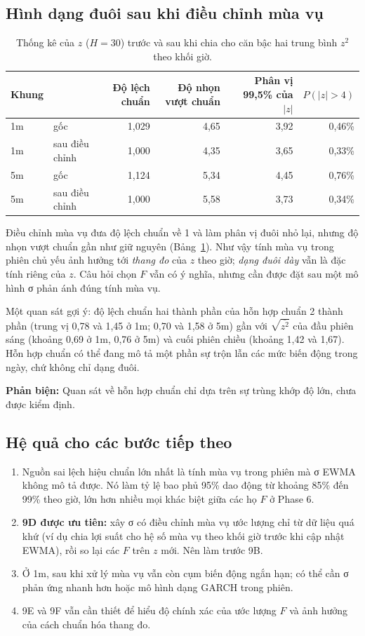 \documentclass[11pt,a4paper]{article}
\newcommand{\phanbien}[1]{\par\noindent\colorbox{orange!15}{\parbox{\dimexpr\linewidth-2\fboxsep}{\small\textbf{Phản biện:} #1}}\par}
\begin{document}
\subsection{Hình dạng đuôi sau khi điều chỉnh mùa vụ}

\begin{table}[h]
\centering
\small
\caption{Thống kê của $z$ ($H=30$) trước và sau khi chia cho căn bậc hai trung bình $z^2$ theo khối giờ.}
\label{tab:9a-duoi}
\begin{tabular}{llrrrr}
\toprule
Khung & & Độ lệch chuẩn & Độ nhọn vượt chuẩn & Phân vị 99,5\% của $|z|$ & $P(|z|>4)$ \\
\midrule
1m & gốc & 1,029 & 4,65 & 3,92 & 0,46\% \\
1m & sau điều chỉnh & 1,000 & 4,35 & 3,65 & 0,33\% \\
5m & gốc & 1,124 & 5,34 & 4,45 & 0,76\% \\
5m & sau điều chỉnh & 1,000 & 5,58 & 3,73 & 0,34\% \\
\bottomrule
\end{tabular}
\end{table}

Điều chỉnh mùa vụ đưa độ lệch chuẩn về 1 và làm phân vị đuôi nhỏ lại, nhưng độ nhọn vượt chuẩn gần như giữ nguyên (Bảng~\ref{tab:9a-duoi}). Như vậy tính mùa vụ trong phiên chủ yếu ảnh hưởng tới \emph{thang đo} của $z$ theo giờ; \emph{dạng đuôi dày} vẫn là đặc tính riêng của $z$. Câu hỏi chọn $F$ vẫn có ý nghĩa, nhưng cần được đặt sau một mô hình σ phản ánh đúng tính mùa vụ.

Một quan sát gợi ý: độ lệch chuẩn hai thành phần của hỗn hợp chuẩn 2 thành phần (trung vị 0,78 và 1,45 ở 1m; 0,70 và 1,58 ở 5m) gần với $\sqrt{\overline{z^2}}$ của đầu phiên sáng (khoảng 0,69 ở 1m, 0,76 ở 5m) và cuối phiên chiều (khoảng 1,42 và 1,67). Hỗn hợp chuẩn có thể đang mô tả một phần sự trộn lẫn các mức biến động trong ngày, chứ không chỉ dạng đuôi.

\phanbien{Quan sát về hỗn hợp chuẩn chỉ dựa trên sự trùng khớp độ lớn, chưa được kiểm định.}

\subsection{Hệ quả cho các bước tiếp theo}

\begin{enumerate}[nosep]
\item Nguồn sai lệch hiệu chuẩn lớn nhất là tính mùa vụ trong phiên mà σ EWMA không mô tả được. Nó làm tỷ lệ bao phủ 95\% dao động từ khoảng 85\% đến 99\% theo giờ, lớn hơn nhiều mọi khác biệt giữa các họ $F$ ở Phase 6.
\item \textbf{9D được ưu tiên:} xây σ có điều chỉnh mùa vụ ước lượng chỉ từ dữ liệu quá khứ (ví dụ chia lợi suất cho hệ số mùa vụ theo khối giờ trước khi cập nhật EWMA), rồi so lại các $F$ trên $z$ mới. Nên làm trước 9B.
\item Ở 1m, sau khi xử lý mùa vụ vẫn còn cụm biến động ngắn hạn; có thể cần σ phản ứng nhanh hơn hoặc mô hình dạng GARCH trong phiên.
\item 9E và 9F vẫn cần thiết để hiểu độ chính xác của ước lượng $F$ và ảnh hưởng của cách chuẩn hóa thang đo.
\end{enumerate}
\end{document}

